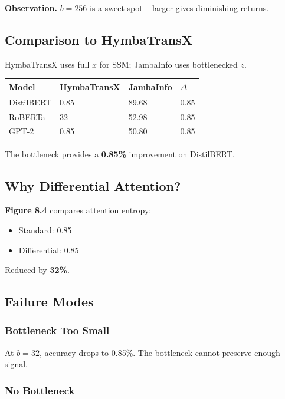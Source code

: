 \textbf{Observation.} $b = 256$ is a sweet spot -- larger gives diminishing returns.

\subsection{Comparison to HymbaTransX}

HymbaTransX uses full $x$ for SSM; JambaInfo uses bottlenecked $z$.

\begin{table}[H]
\centering
\small
\begin{tabular}{llll}
\toprule
\textbf{Model} & \textbf{HymbaTransX} & \textbf{JambaInfo} & \textbf{$\Delta$} \\
\midrule
DistilBERT & 0.85 & 89.68 & 0.85 \\
RoBERTa & 32 & 52.98 & 0.85 \\
GPT-2 & 0.85 & 50.80 & 0.85 \\
\bottomrule
\end{tabular}
\end{table}

The bottleneck provides a \textbf{0.85\%} improvement on DistilBERT.

\subsection{Why Differential Attention?}

\textbf{Figure 8.4} compares attention entropy:
\begin{itemize}
\item Standard: 0.85
\item Differential: 0.85

\end{itemize}
Reduced by \textbf{32\%}.

\subsection{Failure Modes}

\subsubsection{Bottleneck Too Small}

At $b = 32$, accuracy drops to 0.85\%. The bottleneck cannot preserve 
enough signal.

\subsubsection{No Bottleneck}

